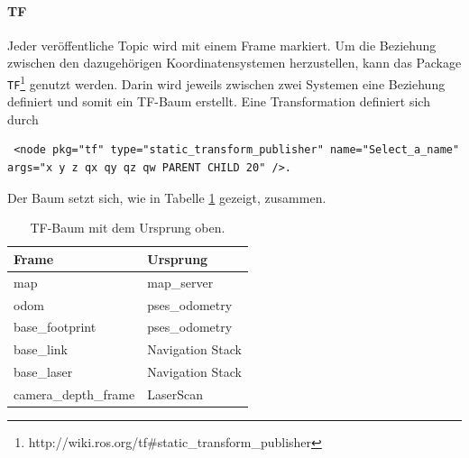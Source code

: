 \paragraph{TF}
Jeder ver\"offentliche Topic wird mit einem Frame markiert. Um die Beziehung zwischen den dazugeh\"origen Koordinatensystemen herzustellen, kann das Package \texttt{TF}\footnote{http://wiki.ros.org/tf\#static\_transform\_publisher} genutzt werden. Darin wird jeweils zwischen zwei Systemen eine Beziehung definiert und somit ein TF-Baum erstellt. Eine Transformation definiert sich durch
\lstset{breaklines=true, basicstyle=\small}
\begin{lstlisting}
 <node pkg="tf" type="static_transform_publisher" name="Select_a_name" args="x y z qx qy qz qw PARENT CHILD 20" />.
\end{lstlisting}
Der Baum setzt sich, wie in Tabelle \ref{tab:TF} gezeigt, zusammen.
\begin{table}[h]
	\centering
	\renewcommand{\arraystretch}{1.2}
	\begin{tabular}{ll}
		Frame & Ursprung  \\ \hline
		map & map\_server \\
		odom & pses\_odometry \\
		base\_footprint & pses\_odometry \\
		base\_link & Navigation Stack \\
		base\_laser & Navigation Stack \\
		camera\_depth\_frame & LaserScan
	\end{tabular}
	\caption{TF-Baum mit dem Ursprung oben.}
	\label{tab:TF}
\end{table}

